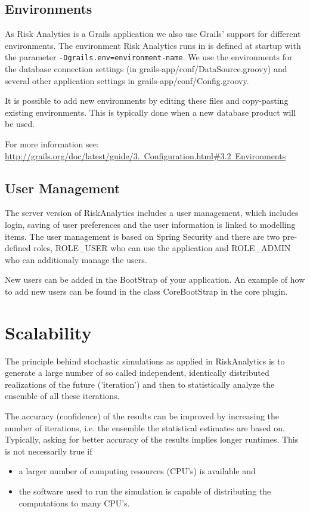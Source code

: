 \section{Environments}

As Risk Analytics is a Grails application we also use Grails' support for different environments. The environment Risk Analytics runs in is defined at startup with the parameter \texttt{-Dgrails.env=environment-name}.
We use the environments for the database connection settings (in grails-app/conf/DataSource.groovy) and several other application settings in grails-app/conf/Config.groovy.

It is possible to add new environments by editing these files and copy-pasting existing environments. This is typically done when a new database product will be used.

For more information see: \href{http://grails.org/doc/latest/guide/3. Configuration.html\#3.2 Environments}{http://grails.org/doc/latest/guide/3.~Configuration.html\#3.2~Environments}

\section{User Management}

The server version of RiskAnalytics includes a user management, which includes login, saving of user preferences and the user information is linked to modelling items.
The user management is based on Spring Security and there are two pre-defined roles, ROLE\_USER who can use the application and ROLE\_ADMIN who can additionaly manage the users.

New users can be added in the BootStrap of your application. An example of how to add new users can be found in the class CoreBootStrap in the core plugin.

\chapter{Scalability}

The principle behind stochastic simulations as applied in RiskAnalytics is to generate a large number of so called independent, identically distributed
realizations of the future ('iteration') and then to statistically analyze the ensemble of all these iterations.

The accuracy (confidence) of the results can be improved by increasing the number of iterations, i.e. the
ensemble the statistical estimates are based on. Typically, asking for better accuracy of the results implies
longer runtimes. This is not necessarily true if
\begin{itemize}
 \item a larger number of computing resources (CPU's) is available and
 \item the software used to run the simulation is capable of distributing the computations to many CPU's.
\end{itemize}

